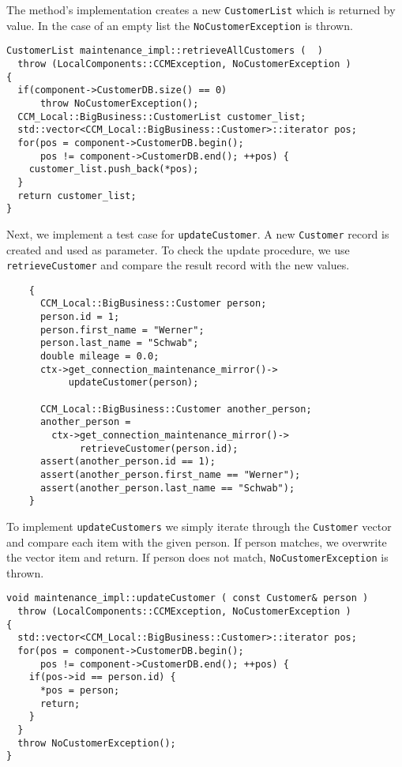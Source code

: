 The method's implementation creates a new {\tt CustomerList} which
is returned by value.
In the case of an empty list the {\tt NoCustomerException} is thrown.

\begin{small}
\begin{verbatim}
CustomerList maintenance_impl::retrieveAllCustomers (  )
  throw (LocalComponents::CCMException, NoCustomerException )
{
  if(component->CustomerDB.size() == 0)
      throw NoCustomerException();
  CCM_Local::BigBusiness::CustomerList customer_list;
  std::vector<CCM_Local::BigBusiness::Customer>::iterator pos;
  for(pos = component->CustomerDB.begin(); 
      pos != component->CustomerDB.end(); ++pos) {
    customer_list.push_back(*pos);
  }
  return customer_list;
}
\end{verbatim}
\end{small}

Next, we implement a test case for {\tt updateCustomer}.
A new {\tt Customer} record is created and used as parameter.
To check the update procedure, we use {\tt retrieveCustomer} 
and compare the result record with the new values.

\begin{small}
\begin{verbatim}
    {
      CCM_Local::BigBusiness::Customer person;
      person.id = 1;
      person.first_name = "Werner";
      person.last_name = "Schwab";
      double mileage = 0.0;
      ctx->get_connection_maintenance_mirror()->
           updateCustomer(person);      

      CCM_Local::BigBusiness::Customer another_person;
      another_person = 
        ctx->get_connection_maintenance_mirror()->
             retrieveCustomer(person.id);
      assert(another_person.id == 1);
      assert(another_person.first_name == "Werner");
      assert(another_person.last_name == "Schwab");
    }
\end{verbatim}
\end{small}



To implement {\tt updateCustomers} we simply iterate through the {\tt Customer}
vector and compare each item with the given person.
If person matches, we overwrite the vector item and return.
If person does not match, {\tt NoCustomerException} is thrown.

\begin{small}
\begin{verbatim}
void maintenance_impl::updateCustomer ( const Customer& person )
  throw (LocalComponents::CCMException, NoCustomerException )
{
  std::vector<CCM_Local::BigBusiness::Customer>::iterator pos;
  for(pos = component->CustomerDB.begin(); 
      pos != component->CustomerDB.end(); ++pos) {
    if(pos->id == person.id) {
      *pos = person;
      return;
    }
  }
  throw NoCustomerException();  
}
\end{verbatim}
\end{small}


